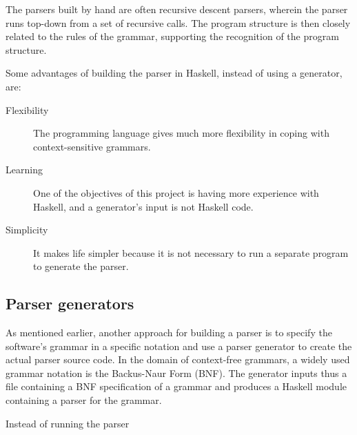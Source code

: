 The parsers built by hand are often recursive descent parsers, wherein the parser runs top-down from a set of recursive calls.
The program structure is then closely related to the rules of the grammar, supporting the recognition of the program structure.


Some advantages of building the parser in Haskell, instead of using a generator, are:
\begin{description}
	\item[Flexibility] The programming language gives much more flexibility in coping with context-sensitive grammars.
	\item[Learning] One of the objectives of this project is having more experience with Haskell, and a generator's input is not Haskell code.
	\item[Simplicity] It makes life simpler because it is not necessary to run a separate program to generate the parser.
\end{description}

\subsection{Parser generators}
As mentioned earlier, another approach for building a parser is to specify the software's grammar in a specific notation and use a parser generator to create the actual parser source code.
In the domain of context-free grammars, a widely used grammar notation is the Backus-Naur Form (BNF).
The generator inputs thus a file containing a BNF specification of a grammar and produces a Haskell module containing a parser for the grammar.

Instead of running the parser 


